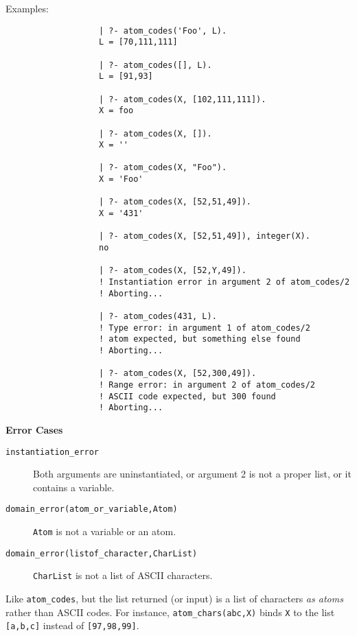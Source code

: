 \begin{description}
    Examples:
    {\footnotesize
     \begin{verbatim}
                   | ?- atom_codes('Foo', L).
                   L = [70,111,111]

                   | ?- atom_codes([], L).
                   L = [91,93]

                   | ?- atom_codes(X, [102,111,111]).
                   X = foo
 
                   | ?- atom_codes(X, []).
                   X = ''

                   | ?- atom_codes(X, "Foo").
                   X = 'Foo'

                   | ?- atom_codes(X, [52,51,49]).
                   X = '431'

                   | ?- atom_codes(X, [52,51,49]), integer(X).
                   no

                   | ?- atom_codes(X, [52,Y,49]).
                   ! Instantiation error in argument 2 of atom_codes/2
                   ! Aborting...

                   | ?- atom_codes(431, L).
                   ! Type error: in argument 1 of atom_codes/2
                   ! atom expected, but something else found
                   ! Aborting...

                   | ?- atom_codes(X, [52,300,49]).
                   ! Range error: in argument 2 of atom_codes/2
                   ! ASCII code expected, but 300 found
                   ! Aborting...
     \end{verbatim}}

{\bf Error Cases}
    \begin{description}
    \item[{\tt instantiation\_error}]
	Both arguments are uninstantiated, or argument 2
	is not a proper list, or it contains a variable.
    \item[{\tt domain\_error(atom\_or\_variable,Atom)}]
	{\tt Atom} is not a variable or an atom.
    \item[{\tt domain\_error(listof\_character,CharList)}]
	{\tt CharList} is not a list of ASCII characters.
    \end{description}

    Like \verb|atom_codes|, but the list returned (or input) is a list of
    characters \emph{as atoms} rather than ASCII codes. For instance, 
    \verb|atom_chars(abc,X)| binds {\tt X} to the list {\tt [a,b,c]}
    instead of {\tt [97,98,99]}.


\end{description}

